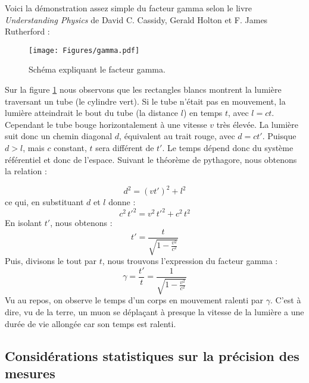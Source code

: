 \documentclass[a4paper, 12pt]{article}
\begin{document}
\begin{spacing}{1.5}
Voici la démonstration assez simple du facteur gamma selon le livre \emph{Understanding Physics} de David C. Cassidy, Gerald Holton et F. James Rutherford :

\begin{figure}[t]
\begin{center}
\texttt{[image: Figures/gamma.pdf]}
\caption{\label{fig:SSgamma} Schéma expliquant le facteur gamma.}
\end{center}
\end{figure}

Sur la figure \ref{fig:SSgamma} nous observons que les rectangles blancs montrent la lumière traversant un tube (le cylindre vert). Si le tube n'était pas en mouvement, la lumière atteindrait le bout du tube (la distance $l$) en temps $t$, avec $l = ct$. Cependant le tube bouge horizontalement à une vitesse $v$ très élevée. La lumière suit donc un chemin diagonal $d$, équivalent au trait rouge, avec $d = ct'$. Puisque $d>l$, mais $c$ constant, $t$ sera différent de $t'$. Le temps dépend donc du système référentiel et donc de l'espace. Suivant le théorème de pythagore, nous obtenons la relation :

\begin{equation}
d^2 = (vt')^2 +  l^2 \label{eq:gammaA}
\end{equation}
ce qui, en substituant $d$ et $l$ donne :
\begin{equation}
c^2\,t'^2 = v^2\,t'^2 +c^2\,t^2 \label{eq:gammaB}
\end{equation}
En isolant $t'$, nous obtenons :
\begin{equation}
t' = \frac{t}{\sqrt{1-\frac{v^2}{c^2}}} \label{eq:gammaC}
\end{equation}
Puis, divisons le tout par $t$, nous trouvons l'expression du facteur gamma :
\begin{equation}
\gamma = \frac{t'}{t} = \frac{1}{\sqrt{1-\frac{v^2}{c^2}}} \label{eq:gammaF}
\end{equation}
Vu au repos, on observe le temps d'un corps en mouvement ralenti par $\gamma$. C'est à dire, vu de la terre, un muon se déplaçant à presque la vitesse de la lumière a une durée de vie allongée car son temps est ralenti. 

\subsection{Considérations statistiques sur la précision des mesures}
\label{sec:sigma}


\end{spacing}
\end{document}
